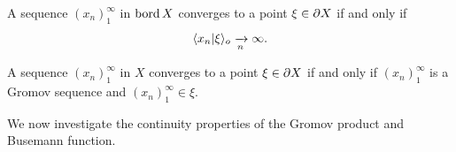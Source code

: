 \begin{observation}
\label{observationboundaryconvergence}
A sequence $(x_n)_1^\infty$ in $\operatorname{bord} X$ converges to a point $\xi\in \partial X$ if and only if
\begin{equation}\label{boundaryconvergence}
\langle x_n|\xi\rangle_o \xrightarrow[n]{} \infty.
\end{equation}
\end{observation}

\begin{observation}
\label{observationboundaryconvergence2}
A sequence $(x_n)_1^\infty$ in $X$ converges to a point $\xi\in \partial X$ if and only if $(x_n)_1^\infty$ is a Gromov sequence and $(x_n)_1^\infty\in\xi$.
\end{observation}



We now investigate the continuity properties of the Gromov product and Busemann function.

